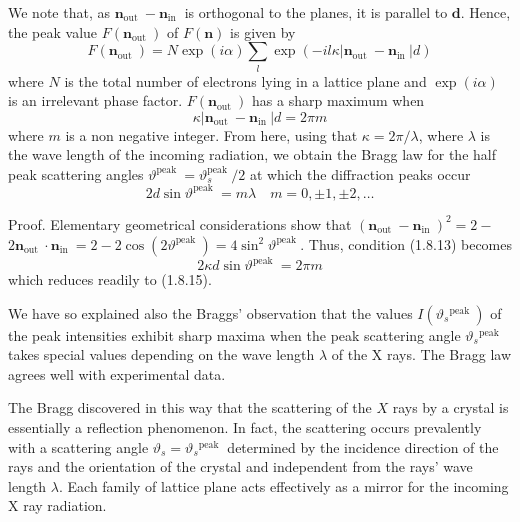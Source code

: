 \documentclass{article}
\begin{document}
We note that, as $\boldsymbol{n}_{\text {out }}-\boldsymbol{n}_{\text {in }}$ is orthogonal to the planes, it is parallel to $\boldsymbol{d}$. Hence, the peak value $F\left(\boldsymbol{n}_{\text {out }}\right)$ of $F(\boldsymbol{n})$ is given by
$$
\begin{equation*}
F\left(\boldsymbol{n}_{\text {out }}\right)=N \exp (i \alpha) \sum_{l} \exp \left(-i l \kappa\left|\boldsymbol{n}_{\text {out }}-\boldsymbol{n}_{\text {in }}\right| d\right) \tag{1.8.13}
\end{equation*}
$$
where $N$ is the total number of electrons lying in a lattice plane and $\exp (i \alpha)$ is an irrelevant phase factor. $F\left(\boldsymbol{n}_{\text {out }}\right)$ has a sharp maximum when
$$
\begin{equation*}
\kappa\left|\boldsymbol{n}_{\text {out }}-\boldsymbol{n}_{\text {in }}\right| d=2 \pi m \tag{1.8.14}
\end{equation*}
$$
where $m$ is a non negative integer. From here, using that $\kappa=2 \pi / \lambda$, where $\lambda$ is
the wave length of the incoming radiation, we obtain the Bragg law for the half peak scattering angles $\vartheta^{\text {peak }}=\vartheta_{s}^{\text {peak }} / 2$ at which the diffraction peaks occur
$$
\begin{equation*}
2 d \sin \vartheta^{\text {peak }}=m \lambda \quad m=0, \pm 1, \pm 2, \ldots \tag{1.8.15}
\end{equation*}
$$

Proof. Elementary geometrical considerations show that $\left(\boldsymbol{n}_{\text {out }}-\boldsymbol{n}_{\text {in }}\right)^{2}=2-$ $2 \boldsymbol{n}_{\text {out }} \cdot \boldsymbol{n}_{\text {in }}=2-2 \cos \left(2 \vartheta^{\text {peak }}\right)=4 \sin ^{2} \vartheta^{\text {peak }}$. Thus, condition (1.8.13) becomes
$$
\begin{equation*}
2 \kappa d \sin \vartheta^{\text {peak }}=2 \pi m \tag{1.8.16}
\end{equation*}
$$
which reduces readily to (1.8.15).

We have so explained also the Braggs' observation that the values $I\left(\vartheta_{s}{ }^{\text {peak }}\right)$ of the peak intensities exhibit sharp maxima when the peak scattering angle $\vartheta_{s}{ }^{\text {peak }}$ takes special values depending on the wave length $\lambda$ of the X rays. The Bragg law agrees well with experimental data.

The Bragg discovered in this way that the scattering of the $X$ rays by a crystal is essentially a reflection phenomenon. In fact, the scattering occurs prevalently with a scattering angle $\vartheta_{s}=\vartheta_{s}{ }^{\text {peak }}$ determined by the incidence direction of the rays and the orientation of the crystal and independent from the rays' wave length $\lambda$. Each family of lattice plane acts effectively as a mirror for the incoming X ray radiation.
\end{document}
